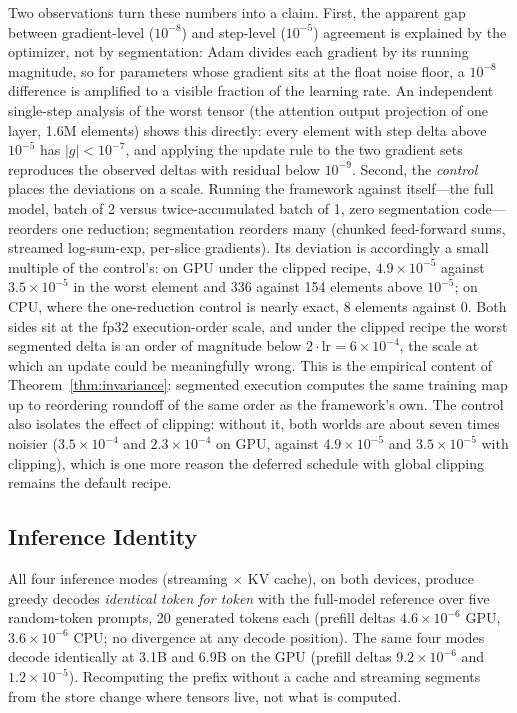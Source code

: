 \documentclass[journal]{IEEEtran}
\begin{document}
Two observations turn these numbers into a claim. First, the apparent gap
between gradient-level ($10^{-8}$) and step-level ($10^{-5}$) agreement is
explained by the optimizer, not by segmentation: Adam divides each gradient
by its running magnitude, so for parameters whose gradient sits at the
float noise floor, a $10^{-8}$ difference is amplified to a visible fraction
of the learning rate. An independent single-step analysis of the worst
tensor (the attention output projection of one layer, 1.6M elements) shows
this directly: every element with step delta above $10^{-5}$ has
$|g|<10^{-7}$, and applying the update rule to the two gradient sets
reproduces the observed deltas with residual below $10^{-9}$. Second, the
\emph{control} places the deviations on a scale. Running the framework
against itself---the full model, batch of 2 versus twice-accumulated batch
of 1, zero segmentation code---reorders one reduction; segmentation
reorders many (chunked feed-forward sums, streamed log-sum-exp, per-slice
gradients). Its deviation is accordingly a small multiple of the
control's: on GPU under the clipped recipe, $4.9{\times}10^{-5}$ against
$3.5{\times}10^{-5}$ in the worst element and 336 against 154 elements
above $10^{-5}$; on CPU, where the one-reduction control is nearly exact,
8 elements against 0. Both sides sit at the fp32 execution-order scale, and
under the clipped recipe the worst segmented delta is an order of magnitude
below $2\cdot\text{lr}=6{\times}10^{-4}$, the scale at which an update
could be meaningfully wrong. This is the empirical content of
Theorem~\ref{thm:invariance}: segmented execution computes the same
training map up to reordering roundoff of the same order as the
framework's own. The control also isolates the effect of clipping: without
it, both worlds are about seven times noisier ($3.5{\times}10^{-4}$ and
$2.3{\times}10^{-4}$ on GPU, against $4.9{\times}10^{-5}$ and
$3.5{\times}10^{-5}$ with clipping), which is one more reason the deferred
schedule with global clipping remains the default recipe.

\subsection{Inference Identity}\label{sec:inferexact}
All four inference modes (streaming $\times$ KV cache), on both devices,
produce greedy decodes \emph{identical token for token} with the full-model
reference over five random-token prompts, 20 generated tokens each
(prefill deltas $4.6{\times}10^{-6}$ GPU, $3.6{\times}10^{-6}$ CPU; no
divergence at any decode position). The same four modes decode identically
at 3.1B and 6.9B on the GPU (prefill deltas $9.2{\times}10^{-6}$ and
$1.2{\times}10^{-5}$). Recomputing the prefix without a cache
and streaming segments from the store change where tensors live, not what
is computed.
\end{document}
